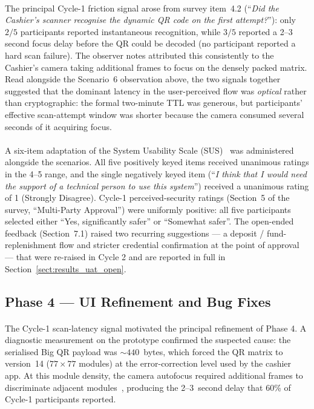 \paragraph{}The principal Cycle-1 friction signal arose from survey item~4.2 (``\textit{Did the Cashier's scanner recognise the dynamic QR code on the first attempt?}''): only $2 / 5$ participants reported instantaneous recognition, while $3 / 5$ reported a 2--3 second focus delay before the QR could be decoded (no participant reported a hard scan failure). The observer notes attributed this consistently to the Cashier's camera taking additional frames to focus on the densely packed matrix. Read alongside the Scenario~6 observation above, the two signals together suggested that the dominant latency in the user-perceived flow was \textit{optical} rather than cryptographic: the formal two-minute TTL was generous, but participants' effective scan-attempt window was shorter because the camera consumed several seconds of it acquiring focus.

\paragraph{}A six-item adaptation of the System Usability Scale (SUS)~\cite{brooke1996sus, bangor2008sus} was administered alongside the scenarios. All five positively keyed items received unanimous ratings in the 4--5 range, and the single negatively keyed item (``\textit{I think that I would need the support of a technical person to use this system}'') received a unanimous rating of 1 (Strongly Disagree). Cycle-1 perceived-security ratings (Section~5 of the survey, ``Multi-Party Approval'') were uniformly positive: all five participants selected either ``Yes, significantly safer'' or ``Somewhat safer''. The open-ended feedback (Section~7.1) raised two recurring suggestions --- a deposit / fund-replenishment flow and stricter credential confirmation at the point of approval --- that were re-raised in Cycle 2 and are reported in full in Section~\ref{sect:results_uat_open}.

\subsection{Phase 4 --- UI Refinement and Bug Fixes}
\label{sect:results_refine}

\paragraph{}The Cycle-1 scan-latency signal motivated the principal refinement of Phase 4. A diagnostic measurement on the prototype confirmed the suspected cause: the serialised Big QR payload was $\sim 440$~bytes, which forced the QR matrix to version~14 ($77 \times 77$ modules) at the error-correction level used by the cashier app. At this module density, the camera autofocus required additional frames to discriminate adjacent modules~\cite{corpuz2025}, producing the 2--3~second delay that 60\% of Cycle-1 participants reported.

